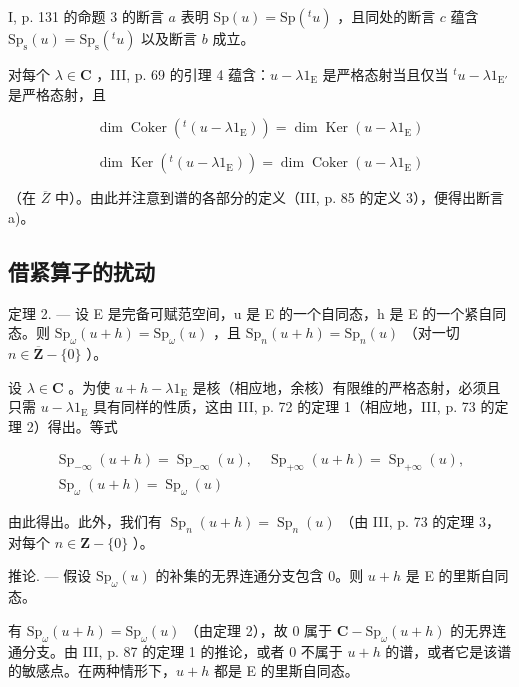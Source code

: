 I, p. 131 的命题 3 的断言 \(a\) 表明 \(\mathrm{Sp}(u) = \mathrm{Sp}({}^{t}u)\) ，且同处的断言 \(c\) 蕴含 \(\mathrm{Sp}_{\mathrm{s}}(u) = \mathrm{Sp}_{\mathrm{s}}({}^{t}u)\) 以及断言 \(b\) 成立。

对每个 \(\lambda \in \mathbf{C}\) ，III, p. 69 的引理 4 蕴含：\(u - \lambda 1_{\mathrm{E}}\) 是严格态射当且仅当 \({}^{t}u - \lambda 1_{\mathrm{E}'}\) 是严格态射，且

\[
\dim \operatorname{Coker} (^ {t} (u - \lambda 1 _ {\mathrm{E}})) = \dim \operatorname{Ker} (u - \lambda 1 _ {\mathrm{E}})
\]

\[
\dim \operatorname{Ker} (^ {t} (u - \lambda 1 _ {\mathrm{E}})) = \dim \operatorname{Coker} (u - \lambda 1 _ {\mathrm{E}})
\]

（在 \(\overline{Z}\) 中）。由此并注意到谱的各部分的定义（III, p. 85 的定义 3），便得出断言 a)。

\subsection{借紧算子的扰动}

定理 2. --- 设 E 是完备可赋范空间，u 是 E 的一个自同态，h 是 E 的一个紧自同态。则 \(\mathrm{Sp}_{\omega}(u + h) = \mathrm{Sp}_{\omega}(u)\) ，且 \(\mathrm{Sp}_n(u + h) = \mathrm{Sp}_n(u)\) （对一切 \(n \in \overline{\mathbf{Z}} - \{0\}\) ）。

设 \(\lambda \in \mathbf{C}\) 。为使 \(u + h - \lambda 1_{\mathrm{E}}\) 是核（相应地，余核）有限维的严格态射，必须且只需 \(u - \lambda 1_{\mathrm{E}}\) 具有同样的性质，这由 III, p. 72 的定理 1（相应地，III, p. 73 的定理 2）得出。等式

\[
\begin{array}{c} \operatorname{Sp} _ {- \infty} (u + h) = \operatorname{Sp} _ {- \infty} (u), \quad \operatorname{Sp} _ {+ \infty} (u + h) = \operatorname{Sp} _ {+ \infty} (u), \\ \operatorname{Sp} _ {\omega} (u + h) = \operatorname{Sp} _ {\omega} (u) \end{array}
\]

由此得出。此外，我们有 \(\operatorname{Sp}_{n}(u+h)=\operatorname{Sp}_{n}(u)\) （由 III, p. 73 的定理 3，对每个 \(n\in \mathbf{Z}-\{0\}\) ）。

推论. --- 假设 \(\mathrm{Sp}_{\omega}(u)\) 的补集的无界连通分支包含 0。则 \(u + h\) 是 E 的里斯自同态。

有 \(\mathrm{Sp}_{\omega}(u+h)=\mathrm{Sp}_{\omega}(u)\) （由定理 2），故 0 属于 \(\mathbf{C}-\mathrm{Sp}_{\omega}(u+h)\) 的无界连通分支。由 III, p. 87 的定理 1 的推论，或者 0 不属于 \(u+h\) 的谱，或者它是该谱的敏感点。在两种情形下，\(u+h\) 都是 E 的里斯自同态。

